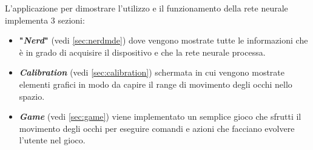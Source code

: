 L'applicazione per dimostrare l'utilizzo e il funzionamento della rete neurale implementa 3 sezioni:

\begin{itemize}
    \item \textbf{"\textit{Nerd}"} (vedi \ref{sec:nerdmde}) dove vengono mostrate tutte le informazioni che è in grado di acquisire il dispositivo e che la rete neurale processa.
    
    \item \textbf{\textit{Calibration}} (vedi \ref{sec:calibration}) schermata in cui vengono mostrate elementi grafici in modo da capire il range di movimento degli occhi nello spazio.
    
    \item \textbf{\textit{Game}} (vedi \ref{sec:game}) viene implementato un semplice gioco che sfrutti il movimento degli occhi per eseguire comandi e azioni che facciano evolvere l'utente nel gioco.
\end{itemize}